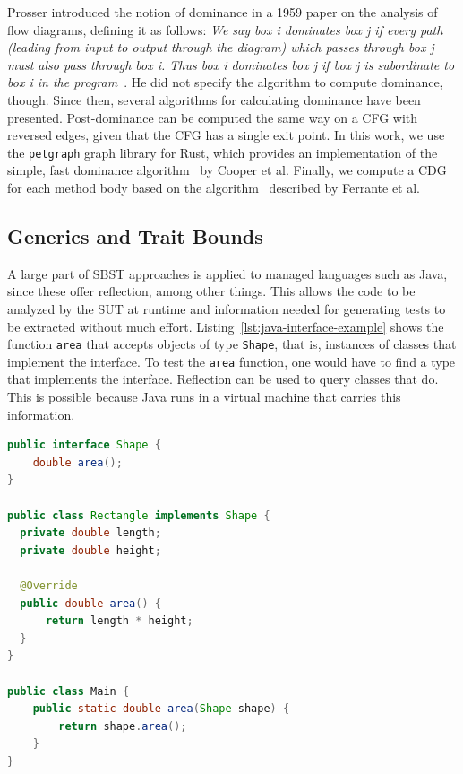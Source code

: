 \documentclass{article}
\begin{document}
Prosser introduced the notion of dominance in a 1959 paper on the analysis of flow diagrams, defining it as follows:
\textit{We say box i dominates box j if every path (leading from input to output through the diagram) which passes through box j must also pass through box i. Thus box i dominates box j if box j is subordinate to box i in the program}~\cite{Prosser1959}. He did not specify the algorithm to compute dominance, though. Since then, several algorithms for calculating dominance have been presented. Post-dominance can be computed the same way on a \ac{CFG} with reversed edges, given that the \ac{CFG} has a single exit point. In this work, we use the \lstinline{petgraph} graph library for Rust, which provides an implementation of the simple, fast dominance algorithm~\cite{Cooper2001} by Cooper et al. Finally, we compute a \ac{CDG} for each method body based on the algorithm~\cite{Ferrante1987} described by Ferrante et al.

\subsection{Generics and Trait Bounds}
A large part of SBST approaches is applied to managed languages such as Java, since these offer reflection, among other things. This allows the code to be analyzed by the SUT at runtime and information needed for generating tests to be extracted without much effort. Listing~\ref{lst:java-interface-example} shows the function \lstinline{area} that accepts objects of type \lstinline{Shape}, that is, instances of classes that implement the interface. To test the \lstinline{area} function, one would have to find a type that implements the interface. Reflection can be used to query classes that do. This is possible because Java runs in a virtual machine that carries this information.

\begin{lstlisting}[language=Java, style=boxed, caption={A function that takes objects implementing an interface}, label=lst:java-interface-example]
public interface Shape {
    double area();
}

public class Rectangle implements Shape {
  private double length;
  private double height;

  @Override
  public double area() {
      return length * height;
  }
}

public class Main {
    public static double area(Shape shape) {
        return shape.area();
    }
}
\end{lstlisting}
\end{document}
